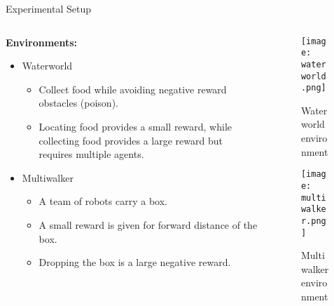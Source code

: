 \begin{frame}{Experimental Setup}
\begin{columns}
    \begin{column}{0.6\textwidth}
        \textbf{Environments:}
        \begin{itemize}
            \item Waterworld
            \begin{itemize}
                \item Collect food while avoiding negative reward obstacles (poison).
                \item Locating food provides a small reward, 
                    while collecting food provides a large reward but requires multiple agents.
            \end{itemize}
            \item Multiwalker
            \begin{itemize}
                \item A team of robots carry a box.
                \item A small reward is given for forward distance of the box.
                \item Dropping the box is a large negative reward.
            \end{itemize}
        \end{itemize}
    \end{column}
    \begin{column}{0.4\textwidth}
        \begin{figure}
            \texttt{[image: waterworld.png]}
            \caption{Waterworld environment}
        \end{figure}
        \vspace{-1em}
        \begin{figure}
            \texttt{[image: multiwalker.png]}
            \caption{Multiwalker environment}
        \end{figure}
    \end{column}
\end{columns}
\end{frame}



